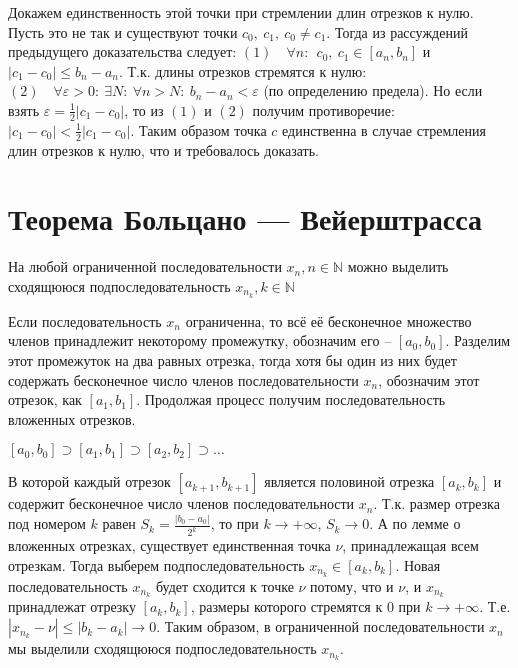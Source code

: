 Докажем единственность этой точки при стремлении длин отрезков к нулю.\newline
Пусть это не так и существуют точки $c_0,\ c_1,\ c_0 \neq c_1$. Тогда из рассуждений предыдущего доказательства следует:\newline
$(1) \quad \forall n:\ \ c_0,\ c_1 \in [a_n, b_n]$ и $|c_1 - c_0| \leq b_n - a_n$.
Т.к. длины отрезков стремятся к нулю:\newline
$(2) \quad \forall \varepsilon > 0:\ \exists N:\ \forall n > N:\ b_n - a_n < \varepsilon$ (по определению предела).\newline
Но если взять $\varepsilon = \frac{1}{2} |c_1 - c_0|$, то из $(1)$ и $(2)$ получим противоречие: $|c_1 - c_0| < \frac{1}{2} |c_1 - c_0|$.\newline
Таким образом точка $c$ единственна в случае стремления длин отрезков к нулю, что и требовалось доказать.

\section[Т. Больцано]{Теорема Больцано — Вейерштрасса}
\begin{theorem}
На любой ограниченной последовательности $x_n, n \in \mathbb{N}$ можно выделить сходящююся подпоследовательность $x_{n_k}, k \in \mathbb{N}$
\end{theorem}
Если последовательность $x_n$ ограниченна, то всё её бесконечное множество членов принадлежит некоторому промежутку, обозначим его -- $[a_0, b_0]$. Разделим этот промежуток на два равных отрезка, тогда хотя бы один из них будет содержать бесконечное число членов последовательности $x_n$, обозначим этот отрезок, как $[a_1, b_1]$. Продолжая процесс получим последовательность вложенных отрезков.
\begin{center}$[a_0, b_0] \supset [a_1, b_1] \supset [a_2, b_2] \supset \ldots$\end{center}
В которой каждый отрезок $[a_{k+1}, b_{k+1}]$ является половиной отрезка $[a_{k}, b_{k}]$ и содержит бесконечное число членов последовательности $x_n$. Т.к. размер отрезка под номером $k$ равен $S_k=\frac{|b_0-a_0|}{2^k}$, то при $k \to +\infty$, $S_k \to 0$. А по лемме о вложенных отрезках, существует единственная точка $\nu$, принадлежащая всем отрезкам.
Тогда выберем подпоследовательность $x_{n_k} \in [a_k, b_k]$. Новая последовательность $x_{n_k}$ будет сходится к точке $\nu$ потому, что и $\nu$, и $x_{n_k}$ принадлежат отрезку $[a_k, b_k]$, размеры которого стремятся к $0$ при $k \to +\infty$. Т.е. $|x_{n_k}-\nu| \leq |b_k - a_k| \to 0$. Таким образом, в ограниченной последовательности $x_n$ мы выделили сходящююся подпоследовательность $x_{n_k}$.

